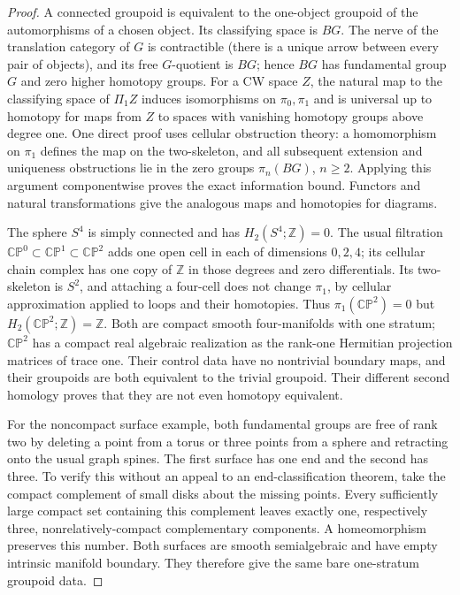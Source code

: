 \begin{proof}
A connected groupoid is equivalent to the one-object groupoid
of the automorphisms of a chosen object. Its classifying space
is $BG$. The nerve of the translation category of $G$ is
contractible (there is a unique arrow between every pair of
objects), and its free $G$-quotient is $BG$; hence $BG$ has
fundamental group $G$ and zero higher homotopy groups.
For a CW space $Z$, the natural map to the classifying space
of $\Pi_1 Z$ induces isomorphisms on $\pi_0,\pi_1$ and is
universal up to homotopy for maps from $Z$ to spaces with
vanishing homotopy groups above degree one. One direct proof
uses cellular obstruction theory: a homomorphism on $\pi_1$
defines the map on the two-skeleton, and all subsequent
extension and uniqueness obstructions lie in the zero groups
$\pi_n(BG)$, $n\ge2$. Applying this argument componentwise
proves the exact information bound. Functors and natural
transformations give the analogous maps and homotopies for
diagrams.

The sphere $S^4$ is simply connected and has $H_2(S^4;\mathbb Z)=0$.
The usual filtration
$\mathbb{CP}^0\subset\mathbb{CP}^1\subset\mathbb{CP}^2$
adds one open cell in each of dimensions $0,2,4$; its cellular
chain complex has one copy of $\mathbb Z$ in those degrees
and zero differentials. Its two-skeleton is $S^2$, and
attaching a four-cell does not change $\pi_1$, by cellular
approximation applied to loops and their homotopies.
Thus $\pi_1(\mathbb{CP}^2)=0$ but
$H_2(\mathbb{CP}^2;\mathbb Z)=\mathbb Z$.
Both are compact smooth four-manifolds with one stratum;
$\mathbb{CP}^2$ has a compact real algebraic realization as
the rank-one Hermitian projection matrices of trace one.
Their control data have no nontrivial boundary maps, and
their groupoids are both equivalent to the trivial groupoid.
Their different second homology proves that they are not
even homotopy equivalent.

For the noncompact surface example, both fundamental groups
are free of rank two by deleting a point from a torus or three
points from a sphere and retracting onto the usual graph
spines. The first surface has one end and the second has
three. To verify this without an appeal to an end-classification
theorem, take the compact complement of small disks about
the missing points. Every sufficiently large compact set
containing this complement leaves exactly one, respectively
three, nonrelatively-compact complementary components.
A homeomorphism preserves this number. Both surfaces are
smooth semialgebraic and have empty intrinsic manifold boundary.
They therefore give the same bare one-stratum groupoid data.


\end{proof}
